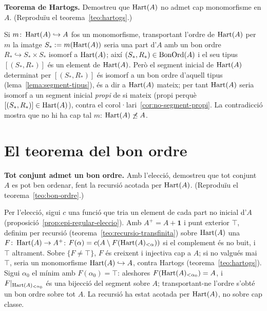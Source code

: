 \begin{exercici}
\textbf{Teorema de Hartogs.} Demostreu que \(\operatorname{Hart}(A)\) no admet cap monomorfisme en \(A\). (Reproduïu el teorema~\ref{teo:hartogs}.)
\end{exercici}
\begin{solucio}
Si \(m\colon\operatorname{Hart}(A)\hookrightarrow A\) fos un monomorfisme, transportant l'ordre de \(\operatorname{Hart}(A)\) per \(m\) la imatge \(S_*:=m(\operatorname{Hart}(A))\) seria una part d'\(A\) amb un bon ordre \(R_*\hookrightarrow S_*\times S_*\) isomorf a \(\operatorname{Hart}(A)\); així \((S_*,R_*)\in\operatorname{BonOrd}(A)\) i el seu tipus \([(S_*,R_*)]\) és un element de \(\operatorname{Hart}(A)\). Però el segment inicial de \(\operatorname{Hart}(A)\) determinat per \([(S_*,R_*)]\) és isomorf a un bon ordre d'aquell tipus (lema~\ref{lema:segment-tipus}), és a dir a \(\operatorname{Hart}(A)\) mateix; per tant \(\operatorname{Hart}(A)\) seria isomorf a un segment inicial \emph{propi} de si mateix (propi perquè \([(S_*,R_*)]\in\operatorname{Hart}(A)\)), contra el corol·lari~\ref{cor:no-segment-propi}. La contradicció mostra que no hi ha cap tal \(m\): \(\operatorname{Hart}(A)\not\preceq A\).
\end{solucio}

\section{El teorema del bon ordre}\label{prac:bon-ordre}

\begin{exercici}
\textbf{Tot conjunt admet un bon ordre.} Amb l'elecció, demostreu que tot conjunt \(A\) es pot ben ordenar, fent la recursió acotada per \(\operatorname{Hart}(A)\). (Reproduïu el teorema~\ref{teo:bon-ordre}.)
\end{exercici}
\begin{solucio}
Per l'elecció, sigui \(c\) una funció que tria un element de cada part no inicial d'\(A\) (proposició~\ref{prop:epi-regular-eleccio}). Amb \(A^+=A+\mathbf1\) i punt exterior \(\top\), definim per recursió (teorema~\ref{teo:recursio-transfinita}) sobre \(\operatorname{Hart}(A)\) una \(F\colon\operatorname{Hart}(A)\to A^+\): \(F(\alpha)=c(A\setminus F(\operatorname{Hart}(A)_{<\alpha}))\) si el complement és no buit, i \(\top\) altrament. Sobre \(\{F\ne\top\}\), \(F\) és creixent i injectiva cap a \(A\); si no valgués mai \(\top\), seria un monomorfisme \(\operatorname{Hart}(A)\hookrightarrow A\), contra Hartogs (teorema~\ref{teo:hartogs}). Sigui \(\alpha_0\) el mínim amb \(F(\alpha_0)=\top\): aleshores \(F(\operatorname{Hart}(A)_{<\alpha_0})=A\), i \(F|_{\operatorname{Hart}(A)_{<\alpha_0}}\) és una bijecció del segment sobre \(A\); transportant-ne l'ordre s'obté un bon ordre sobre tot \(A\). La recursió ha estat acotada per \(\operatorname{Hart}(A)\), no sobre cap classe.
\end{solucio}

